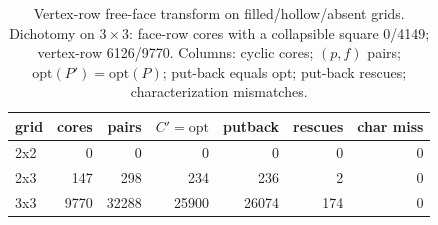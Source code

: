 \begin{table}[h]
\centering\small
\caption{Vertex-row free-face transform on filled/hollow/absent grids. Dichotomy on $3\times 3$: face-row cores with a collapsible square 0/4149; vertex-row 6126/9770. Columns: cyclic cores; $(p,f)$ pairs; $\mathrm{opt}(P')=\mathrm{opt}(P)$; put-back equals opt; put-back rescues; characterization mismatches.}
\label{tab:grid-collapse}
\begin{tabular}{lrrrrrr}
\hline
grid & cores & pairs & $C'=\mathrm{opt}$ & putback & rescues & char miss \\
\hline
2x2 & 0 & 0 & 0 & 0 & 0 & 0 \\
2x3 & 147 & 298 & 234 & 236 & 2 & 0 \\
3x3 & 9770 & 32288 & 25900 & 26074 & 174 & 0 \\
\hline
\end{tabular}
\end{table}
